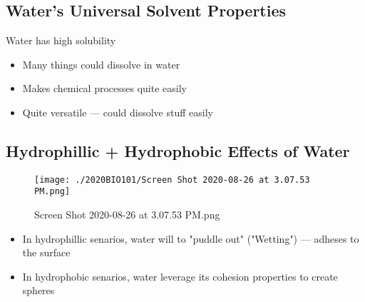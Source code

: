 \documentclass[letterpaper]{article}
\begin{document}
\subsection{Water's Universal Solvent Properties}
\label{sec:orge8f4344}
Water has high solubility

\begin{itemize}
\item Many things could dissolve in water
\item Makes chemical processes quite easily
\item Quite versatile --- could dissolve stuff easily
\end{itemize}

\subsection{Hydrophillic + Hydrophobic Effects of Water}
\label{sec:org7e9e7ba}
\begin{figure}[htbp]
\centering
\texttt{[image: ./2020BIO101/Screen Shot 2020-08-26 at 3.07.53 PM.png]}
\caption{Screen Shot 2020-08-26 at 3.07.53 PM.png}
\end{figure}

\begin{itemize}
\item In hydrophillic senarios, water will to "puddle out" ("Wetting") ---
adheses to the surface
\item In hydrophobic senarios, water leverage its cohesion properties to
create spheres
\end{itemize}
\end{document}
